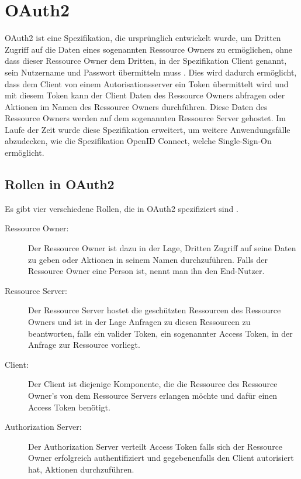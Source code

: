%
%
\section{OAuth2}
\label{sec:OAuth2}
OAuth2 ist eine Spezifikation, die ursprünglich entwickelt wurde, um Dritten Zugriff auf die Daten eines sogenannten Ressource Owners zu ermöglichen, ohne dass dieser Ressource Owner dem Dritten, in der Spezifikation Client genannt, sein Nutzername und Passwort übermitteln muss \citep{oauth2:2012}. Dies wird dadurch ermöglicht, dass dem Client von einem Autorisationsserver ein Token übermittelt wird und mit diesem Token kann der Client Daten des Ressource Owners abfragen oder Aktionen im Namen des Ressource Owners durchführen. Diese Daten des Ressource Owners werden auf dem sogenannten Ressource Server gehostet.
Im Laufe der Zeit wurde diese Spezifikation erweitert, um weitere Anwendungsfälle abzudecken, wie die Spezifikation OpenID Connect, welche Single-Sign-On ermöglicht. 

\subsection{Rollen in OAuth2}
\label{subsec:OAuth2:RolleninOAuth2}
Es gibt vier verschiedene Rollen, die in OAuth2 spezifiziert sind \citep{oauth2:2012}.

\begin{description}
  \item[Ressource Owner:] Der Ressource Owner ist dazu in der Lage, Dritten Zugriff auf seine Daten zu geben oder Aktionen in seinem Namen durchzuführen. Falls der Ressource Owner eine Person ist, nennt man ihn den End-Nutzer.
  \item[Ressource Server:] Der Ressource Server hostet die geschützten Ressourcen des Ressource Owners und ist in der Lage Anfragen zu diesen Ressourcen zu beantworten, falls ein valider Token, ein sogenannter Access Token, in der Anfrage zur Ressource vorliegt.
  \item[Client:] Der Client ist diejenige Komponente, die die Ressource des Ressource Owner's von dem Ressource Servers erlangen möchte und dafür einen Access Token benötigt. 
  \item[Authorization Server:] Der Authorization Server verteilt Access Token falls sich der Ressource Owner erfolgreich authentifiziert und gegebenenfalls den Client autorisiert hat, Aktionen durchzuführen. 
\end{description}

